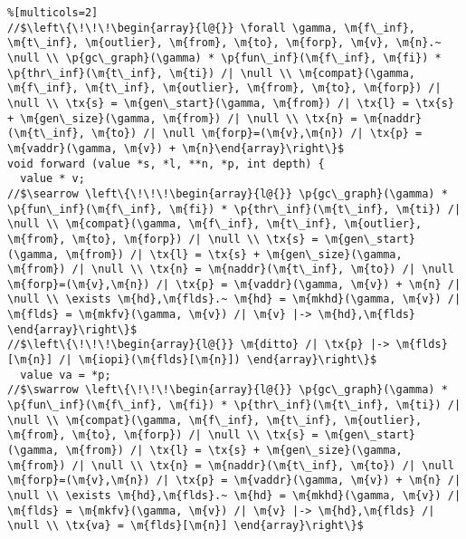  
\begin{figure*}[h!]
\vspace{-1ex}
  \begin{lstlisting}%[multicols=2]
//$\left\{\!\!\!\begin{array}{l@{}} \forall \gamma, \m{f\_inf}, \m{t\_inf}, \m{outlier}, \m{from}, \m{to}, \m{forp}, \m{v}, \m{n}.~ \null \\ \p{gc\_graph}(\gamma) * \p{fun\_inf}(\m{f\_inf}, \m{fi}) * \p{thr\_inf}(\m{t\_inf}, \m{ti}) /| \null \\ \m{compat}(\gamma, \m{f\_inf}, \m{t\_inf}, \m{outlier}, \m{from}, \m{to}, \m{forp}) /| \null \\ \tx{s} = \m{gen\_start}(\gamma, \m{from}) /| \tx{l} = \tx{s} + \m{gen\_size}(\gamma, \m{from}) /| \null \\ \tx{n} = \m{naddr}(\m{t\_inf}, \m{to}) /| \null \m{forp}=(\m{v},\m{n}) /| \tx{p} = \m{vaddr}(\gamma, \m{v}) + \m{n}\end{array}\right\}$
void forward (value *s, *l, **n, *p, int depth) {
  value * v;
//$\searrow \left\{\!\!\!\begin{array}{l@{}} \p{gc\_graph}(\gamma) * \p{fun\_inf}(\m{f\_inf}, \m{fi}) * \p{thr\_inf}(\m{t\_inf}, \m{ti}) /| \null \\ \m{compat}(\gamma, \m{f\_inf}, \m{t\_inf}, \m{outlier}, \m{from}, \m{to}, \m{forp}) /| \null \\ \tx{s} = \m{gen\_start}(\gamma, \m{from}) /| \tx{l} = \tx{s} + \m{gen\_size}(\gamma, \m{from}) /| \null \\ \tx{n} = \m{naddr}(\m{t\_inf}, \m{to}) /| \null \m{forp}=(\m{v},\m{n}) /| \tx{p} = \m{vaddr}(\gamma, \m{v}) + \m{n} /| \null \\ \exists \m{hd},\m{flds}.~ \m{hd} = \m{mkhd}(\gamma, \m{v}) /| \m{flds} = \m{mkfv}(\gamma, \m{v}) /| \m{v} |-> \m{hd},\m{flds} \end{array}\right\}$
//$\left\{\!\!\!\begin{array}{l@{}} \m{ditto} /| \tx{p} |-> \m{flds}[\m{n}] /| \m{iopi}(\m{flds}[\m{n}]) \end{array}\right\}$
  value va = *p; 
//$\swarrow \left\{\!\!\!\begin{array}{l@{}} \p{gc\_graph}(\gamma) * \p{fun\_inf}(\m{f\_inf}, \m{fi}) * \p{thr\_inf}(\m{t\_inf}, \m{ti}) /| \null \\ \m{compat}(\gamma, \m{f\_inf}, \m{t\_inf}, \m{outlier}, \m{from}, \m{to}, \m{forp}) /| \null \\ \tx{s} = \m{gen\_start}(\gamma, \m{from}) /| \tx{l} = \tx{s} + \m{gen\_size}(\gamma, \m{from}) /| \null \\ \tx{n} = \m{naddr}(\m{t\_inf}, \m{to}) /| \null \m{forp}=(\m{v},\m{n}) /| \tx{p} = \m{vaddr}(\gamma, \m{v}) + \m{n} /| \null \\ \exists \m{hd},\m{flds}.~ \m{hd} = \m{mkhd}(\gamma, \m{v}) /| \m{flds} = \m{mkfv}(\gamma, \m{v}) /| \m{v} |-> \m{hd},\m{flds} /| \null \\ \tx{va} = \m{flds}[\m{n}] \end{array}\right\}$

\end{lstlisting}
\end{figure*}
